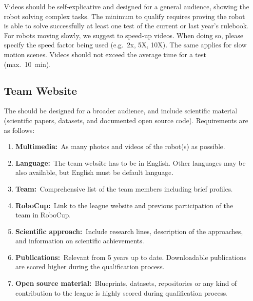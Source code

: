 Videos should be self-explicative and designed for a general audience, showing the  robot solving complex tasks. The minimum to qualify requires proving the robot is able to solve successfully at least one test of the current or last year's rulebook. For robots moving slowly, we suggest to speed-up videos. When doing so, please specify the speed factor being used (e.g.~2x, 5X, 10X). The same applies for slow motion scenes. Videos should not exceed the average time for a test (max.~\SI{10}{\minute}).

\subsection{Team Website}

The  should be designed for a broader audience, and include scientific material (scientific papers, datasets, and documented open source code). Requirements are as follows:

\begin{enumerate}

	\item \textbf{Multimedia:}~As many photos and videos of the robot(s) as possible.

	\item \textbf{Language:}~The team website has to be in English. Other languages may be also available, but English must be default language.

	\item \textbf{Team:}~Comprehensive list of the team members including brief profiles.

	\item \textbf{RoboCup:}~Link to the league website and previous participation of the team in RoboCup.

	\item \textbf{Scientific approach:}~Include research lines, description of the approaches, and information on scientific achievements.

	\item \textbf{Publications:}~Relevant  from 5 years up to date. Downloadable publications are scored higher during the qualification process.

	\item \textbf{Open source material:}~Blueprints, datasets, repositories or any kind of contribution to the league is highly scored during qualification process.
\end{enumerate}


